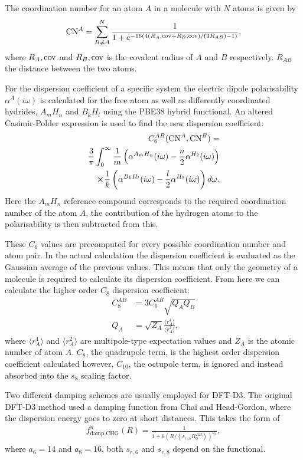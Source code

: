\documentclass[10pt,a4paper,twocolumn,twoside]{extarticle}
\begin{document}
	The coordination number for an atom $A$ in a molecule with $N$ atoms is given by
	{\small
	\begin{align}
		{\rm CN}^A = \sum_{B \neq A}^N \frac{1}{1 + e^{-16(4(R_A,{\rm cov} + R_B,{\rm cov})/(3R_{AB}) - 1)}},
	\end{align}}
	where $R_A,{\rm cov}$ and $R_B,{\rm cov}$ is the covalent radius of $A$ and $B$ respectively. $R_{AB}$ the distance between the two atoms.

	For the dispersion coefficient of a specific system the electric dipole polarisability $\alpha^A (i\omega)$ is calculated for the free atom as well as differently coordinated hydrides, $A_mH_n$ and $B_kH_l$ using the PBE38 hybrid functional.\cite{Grimme2011} An altered Casimir-Polder expression is used to find the new dispersion coefficient:
	\begin{align}
		C_6^{AB} ({\rm CN}^A , {\rm CN}^B) =  \nonumber \\ \frac{3}{\pi} \int^{\infty}_0 \frac{1}{m} \left(\alpha^{A_m H_n}(i\omega) - \frac{n}{2} \alpha^{H_2} (i\omega) \right) \nonumber \\ \cross \frac{1}{k} \left(\alpha^{B_k H_l}(i\omega) - \frac{l}{2} \alpha^{H_2} (i\omega)\right) d\omega .
	\end{align}
	Here the $A_mH_n$ reference compound corresponds to the required coordination number of the atom $A$, the contribution of the hydrogen atoms to the polarisability is then subtracted from this. 
	
	These $C_6$ values are precomputed for every possible coordination number and atom pair. In the actual calculation the dispersion coefficient is evaluated as the Gaussian average of the previous values. This means that only the geometry of a molecule is required to calculate its dispersion coefficient. From here we can calculate the higher order $C_8$ dispersion coefficient:
	\begin{align}
		C_8^{AB} &= 3C_6^{AB} \sqrt{Q_A Q_B}\\
		Q_A  &= \sqrt{Z_A} \frac{\langle r_A^4 \rangle}{\langle r_A^2 \rangle},
	\end{align}
	where $\langle r_A^4 \rangle$ and $\langle r_A^2 \rangle$ are multipole-type expectation values and $Z_A$ is the atomic number of atom $A$. $C_8$, the quadrupole term, is the highest order dispersion coefficient calculated however, $C_{10}$, the octupole term, is ignored and instead absorbed into the $s_8$ scaling factor.

	Two different damping schemes are usually employed for DFT-D3. The original DFT-D3 method used a damping function from Chai and Head-Gordon\cite{Chai-Gordon-Damp}, where the dispersion energy goes to zero at short distances. 
	This takes the form of 
	\begin{align}
		f^n_\text{damp,CHG}(R) = \frac{1}{1 + 6(R/(s_{r,n}R_0^{AB}))^{a_n}},
	\end{align}
	where $a_6 = 14$ and $a_8 = 16$, both $s_{r,6}$ and $s_{r,8}$ depend on the functional. 
	
\end{document}
